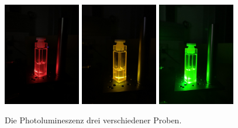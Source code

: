         \FloatBarrier

        \begin{figure}[h]
          \centering
          \includegraphics[width = 0.3\textwidth]{pictures/PL1.jpg}
          \includegraphics[width = 0.3\textwidth]{pictures/PL2.jpg}
          \includegraphics[width = 0.3\textwidth]{pictures/PL3.jpg}
          \caption{Die Photolumineszenz drei verschiedener Proben.}
          \label{fig:PL}
        \end{figure}

        \FloatBarrier